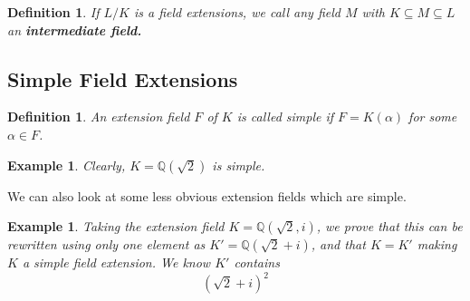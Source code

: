 \documentclass[12pt]{article}
\newtheorem{definition}[theorem]{Definition}
\newtheorem{example}[theorem]{Example}
\begin{document}
\begin{definition}
    If $L/K$ is a field extensions, we call any field $M$ with $K \subseteq M \subseteq L$ an \textbf{intermediate field.}
\end{definition}

\subsection{Simple Field Extensions}
\begin{definition}
An extension field \(F\) of \(K\) is called simple if \(F = K(\alpha)\) for some \(\alpha \in F\).
\end{definition}
\begin{example}
Clearly, \(K = \mathbb{Q}(\sqrt{2})\) is simple.
\end{example}
We can also look at some less obvious extension fields which are simple.
\begin{example}
Taking the extension field \(K = \mathbb{Q}(\sqrt{2}, i)\), we prove that this can be rewritten using only one element as \(K' = \mathbb{Q}(\sqrt{2} + i)\), and that \(K=K'\) making \(K\) a simple field extension. We know \(K'\) contains
\[(\sqrt{2} + i)^2\]
\end{example}
\end{document}

